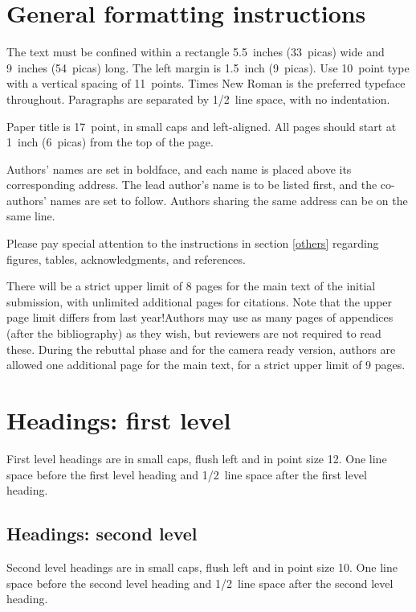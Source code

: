 \documentclass{article} %
\begin{document}
\section{General formatting instructions}
\label{gen_inst}

The text must be confined within a rectangle 5.5~inches (33~picas) wide and
9~inches (54~picas) long. The left margin is 1.5~inch (9~picas).
Use 10~point type with a vertical spacing of 11~points. Times New Roman is the
preferred typeface throughout. Paragraphs are separated by 1/2~line space,
with no indentation.

Paper title is 17~point, in small caps and left-aligned.
All pages should start at 1~inch (6~picas) from the top of the page.

Authors' names are
set in boldface, and each name is placed above its corresponding
address. The lead author's name is to be listed first, and
the co-authors' names are set to follow. Authors sharing the
same address can be on the same line.

Please pay special attention to the instructions in section \ref{others}
regarding figures, tables, acknowledgments, and references.


There will be a strict upper limit of 8 pages for the main text of the initial submission, with unlimited additional pages for citations. Note that the upper page limit differs from last year!Authors may use as many pages of appendices (after the bibliography) as they wish, but reviewers are not required to read these. During the rebuttal phase and for the camera ready version, authors are allowed one additional page for the main text, for a strict upper limit of 9 pages.

\section{Headings: first level}
\label{headings}

First level headings are in small caps,
flush left and in point size 12. One line space before the first level
heading and 1/2~line space after the first level heading.

\subsection{Headings: second level}

Second level headings are in small caps,
flush left and in point size 10. One line space before the second level
heading and 1/2~line space after the second level heading.
\end{document}
